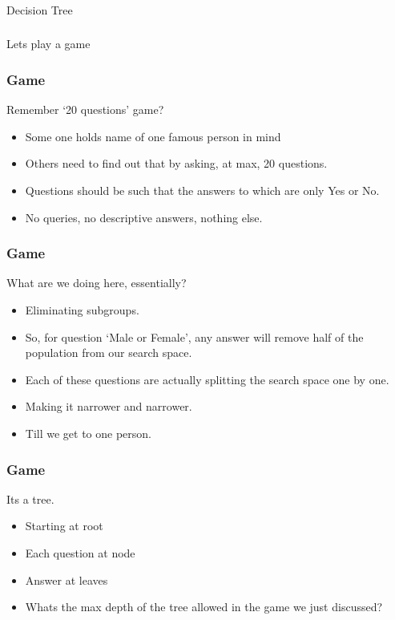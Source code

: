 \begin{frame}[fragile]\frametitle{}
\begin{center}
{\Large Decision Tree}
\end{center}
\end{frame}


\begin{frame}[fragile]\frametitle{}
\begin{center}
{\Large Lets play a game}
\end{center}
\end{frame}


\begin{frame}[fragile]\frametitle{Game}
Remember `20 questions' game?
\begin{itemize}
	\item Some one holds name of one famous person in mind
	\item Others need to find out that by asking, at max, 20 questions.
	\item Questions should be such that the answers to which are only Yes or No.
	\item No queries, no descriptive answers, nothing else.
	\end{itemize}
\end{frame}

\begin{frame}[fragile]\frametitle{Game}
What are we doing here, essentially?
\begin{itemize}
	\item Eliminating subgroups.
	\item So, for question `Male or Female', any answer will remove half of the population from our search space.
	\item Each of these questions are actually splitting the search space one by one.
	\item Making it narrower and narrower.
	\item Till we get to one person.
	\end{itemize}
\end{frame}

\begin{frame}[fragile]\frametitle{Game}
Its a tree.
\begin{itemize}
	\item Starting at root
	\item Each question at node
	\item Answer at leaves
	\item Whats the max depth of the tree allowed in the game we just discussed?
	\end{itemize}
\end{frame}

